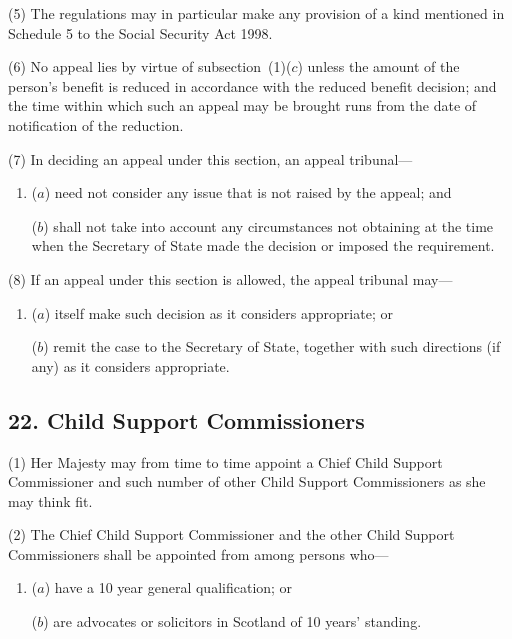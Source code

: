 \documentclass[12pt,a4paper]{article}
\begin{document}
(5) The regulations may in particular make any provision of a kind mentioned in Schedule 5 to the Social Security Act 1998. 

(6) No appeal lies by virtue of subsection~(1)($c$)  unless the amount of the person’s benefit is reduced in accordance with the reduced benefit decision; and the time within which such an appeal may be brought runs from the date of notification of the reduction.

(7) In deciding an appeal under this section, an appeal tribunal—
\begin{enumerate}\item[]
($a$) need not consider any issue that is not raised by the appeal; and

($b$) shall not take into account any circumstances not obtaining at the time when the Secretary of State made the decision or imposed the requirement.
\end{enumerate}

(8) If an appeal under this section is allowed, the appeal tribunal may—
\begin{enumerate}\item[]
($a$) itself make such decision as it considers appropriate; or

($b$) remit the case to the Secretary of State, together with such directions (if any) as it considers appropriate.
\end{enumerate}


\subsection{22. Child Support Commissioners}

(1) Her Majesty may from time to time appoint a Chief Child Support Commissioner and such number of other Child Support Commissioners as she may think fit.

(2) The Chief Child Support Commissioner and the other Child Support Commissioners shall be appointed from among persons who—
\begin{enumerate}\item[]
($a$) have a 10 year general qualification; or

($b$) are advocates or solicitors in Scotland of 10 years' standing.
\end{enumerate}
\end{document}
